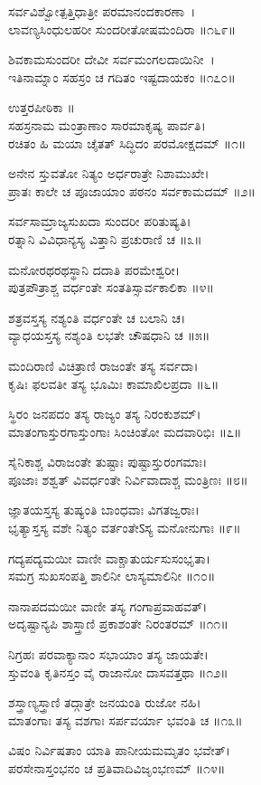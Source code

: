 ಸರ್ವವಿಶ್ವೋತ್ಪತ್ತಿಧಾತ್ರೀ ಪರಮಾನಂದಕಾರಣಾ~।\\
ಲಾವಣ್ಯಸಿಂಧುಲಹರೀ ಸುಂದರೀತೋಷಮಂದಿರಾ ॥೧೬೯॥

	ಶಿವಕಾಮಸುಂದರೀ ದೇವೀ ಸರ್ವಮಂಗಲದಾಯಿನೀ~।\\
	ಇತಿನಾಮ್ನಾಂ ಸಹಸ್ರಂ ಚ ಗದಿತಂ ಇಷ್ಟದಾಯಕಂ ॥೧೭೦॥

ಉತ್ತರಪೀಠಿಕಾ ॥\\
ಸಹಸ್ರನಾಮ ಮಂತ್ರಾಣಾಂ ಸಾರಮಾಕೃಷ್ಯ ಪಾರ್ವತಿ।\\
ರಚಿತಂ ಹಿ ಮಯಾ ಚೈತತ್ ಸಿದ್ಧಿದಂ ಪರಮೋಕ್ಷದಮ್ ॥೧॥

ಅನೇನ ಸ್ತುವತೋ ನಿತ್ಯಂ ಅರ್ಧರಾತ್ರೇ ನಿಶಾಮುಖೇ।\\
ಪ್ರಾತಃ ಕಾಲೇ ಚ ಪೂಜಾಯಾಂ ಪಠನಂ ಸರ್ವಕಾಮದಮ್ ॥೨॥

ಸರ್ವಸಾಮ್ರಾಜ್ಯಸುಖದಾ ಸುಂದರೀ ಪರಿತುಷ್ಯತಿ।\\
ರತ್ನಾನಿ ವಿವಿಧಾನ್ಯಸ್ಯ ವಿತ್ತಾನಿ ಪ್ರಚುರಾಣಿ ಚ ॥೩॥

ಮನೋರಥರಥಸ್ಥಾನಿ ದದಾತಿ ಪರಮೇಶ್ವರೀ।\\
ಪುತ್ರಪೌತ್ರಾಶ್ಚ ವರ್ಧಂತೇ ಸಂತತಿಸ್ಸಾರ್ವಕಾಲಿಕಾ ॥೪॥

ಶತ್ರವಸ್ತಸ್ಯ ನಶ್ಯಂತಿ ವರ್ಧಂತೇ ಚ ಬಲಾನಿ ಚ।\\
ವ್ಯಾಧಯಸ್ತಸ್ಯ ನಶ್ಯಂತಿ ಲಭತೇ ಚೌಷಧಾನಿ ಚ ॥೫॥

ಮಂದಿರಾಣಿ ವಿಚಿತ್ರಾಣಿ ರಾಜಂತೇ ತಸ್ಯ ಸರ್ವದಾ।\\
ಕೃಷಿಃ ಫಲವತೀ ತಸ್ಯ ಭೂಮಿಃ ಕಾಮಾಖಿಲಪ್ರದಾ ॥೬॥

ಸ್ಥಿರಂ ಜನಪದಂ ತಸ್ಯ ರಾಜ್ಯಂ ತಸ್ಯ ನಿರಂಕುಶಮ್।\\
ಮಾತಂಗಾಸ್ತುರಗಾಸ್ತುಂಗಾಃ ಸಿಂಚಿಂತೋ ಮದವಾರಿಭಿಃ ॥೭॥

ಸೈನಿಕಾಶ್ಚ ವಿರಾಜಂತೇ ತುಷ್ಟಾಃ ಪುಷ್ಟಾಸ್ತುರಂಗಮಾಃ।\\
ಪೂಜಾಃ ಶಶ್ವತ್ ವಿವರ್ಧಂತೇ ನಿರ್ವಿವಾದಾಶ್ಚ ಮಂತ್ರಿಣಃ ॥೮॥

ಜ್ಞಾತಯಸ್ತಸ್ಯ ತುಷ್ಯಂತಿ ಬಾಂಧವಾಃ ವಿಗತಜ್ವರಾಃ।\\
ಭೃತ್ಯಾಸ್ತಸ್ಯ ವಶೇ ನಿತ್ಯಂ ವರ್ತಂತೇऽಸ್ಯ ಮನೋನುಗಾಃ ॥೯॥

ಗದ್ಯಪದ್ಯಮಯೀ ವಾಣೀ ವಾಕ್ಚಾತುರ್ಯಸುಸಂಭೃತಾ।\\
ಸಮಗ್ರ ಸುಖಸಂಪತ್ತಿ ಶಾಲಿನೀ ಲಾಸ್ಯಮಾಲಿನೀ ॥೧೦॥

ನಾನಾಪದಮಯೀ ವಾಣೀ ತಸ್ಯ ಗಂಗಾಪ್ರವಾಹವತ್।\\
ಅದೃಷ್ಟಾನ್ಯಪಿ ಶಾಸ್ತ್ರಾಣಿ ಪ್ರಕಾಶಂತೇ ನಿರಂತರಮ್ ॥೧೧॥

ನಿಗ್ರಹಃ ಪರವಾಕ್ಯಾನಾಂ ಸಭಾಯಾಂ ತಸ್ಯ ಜಾಯತೇ।\\
ಸ್ತುವಂತಿ ಕೃತಿನಸ್ತಂ ವೈ ರಾಜಾನೋ ದಾಸವತ್ತಥಾ ॥೧೨॥

ಶಸ್ತ್ರಾಣ್ಯಸ್ತ್ರಾಣಿ ತದ್ಗಾತ್ರೇ ಜನಯಂತಿ ರುಜೋ ನಹಿ।\\
ಮಾತಂಗಾಃ ತಸ್ಯ ವಶಗಾಃ ಸರ್ಪವರ್ಯಾ ಭವಂತಿ ಚ ॥೧೩॥

ವಿಷಂ ನಿರ್ವಿಷತಾಂ ಯಾತಿ ಪಾನೀಯಮಮೃತಂ ಭವೇತ್।\\
ಪರಸೇನಾಸ್ತಂಭನಂ ಚ ಪ್ರತಿವಾದಿವಿಜೃಂಭಣಮ್ ॥೧೪॥

